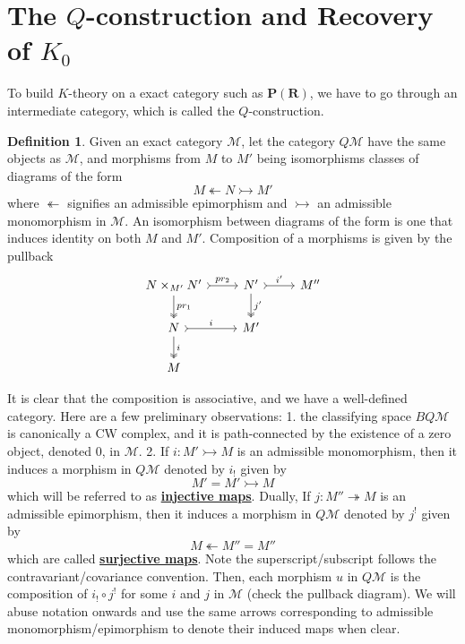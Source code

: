 \documentclass{article}
\theoremstyle{definition}
\theoremstyle{definition}
\newtheorem{definition}{Definition}[theorem]
\theoremstyle{definition}
\theoremstyle{definition}
\theoremstyle{definition}
\theoremstyle{definition}
\theoremstyle{definition}
\begin{document}
\section{The $Q$-construction and Recovery of $K_0$}
To build $K$-theory on a exact category such as $\textbf{P}(\textbf{R})$, we have to go through an intermediate category, which is called the $Q$-construction. 
\begin{tcolorbox}[colback=purple!5!white,colframe=purple!75!black]
\begin{definition}
Given an exact category $\mathcal{M}$, let the category $Q\mathcal{M}$ have the same objects as $\mathcal{M}$, and morphisms from $M$ to $M'$ being isomorphisms classes of diagrams of the form 
\[M\twoheadleftarrow N\rightarrowtail M' \]
where $\twoheadleftarrow$ signifies an admissible epimorphism and $\rightarrowtail$ an admissible monomorphism in $\mathcal{M}$. An isomorphism between diagrams of the form is one that induces identity on both $M$ and $M'$. Composition of a morphisms is given by the pullback 
\[
\begin{tikzcd}
N\times_{M'}N'\arrow[r,rightarrowtail,"pr_2"]\arrow[d,twoheadrightarrow,"pr_1"]&N'\arrow[d,twoheadrightarrow,"j'"]\arrow[r,rightarrowtail,"i'"]&M''\\
N\arrow[d,twoheadrightarrow,"i"]\arrow[r,rightarrowtail,"i"]&M'\\
M
\end{tikzcd}
\]
\end{definition}
\end{tcolorbox}
It is clear that the composition is associative, and we have a well-defined category. Here are a few preliminary observations: 1. the classifying space $BQ\mathcal{M}$ is canonically a CW complex, and it is path-connected by the existence of a zero object, denoted $0$, in $\mathcal{M}$. 2. If $i:M'\rightarrowtail M$ is an admissible monomorphism, then it induces a morphism in $Q\mathcal{M}$ denoted by $i_!$ given by 
\[M'=M'\rightarrowtail M\] 
which will be referred to as \underline{\textbf{injective maps}}. Dually, If $j:M''\twoheadrightarrow M$ is an admissible epimorphism, then it induces a morphism in $Q\mathcal{M}$ denoted by $j^!$ given by 
\[M\twoheadleftarrow M''=M''\] 
which are called \underline{\textbf{surjective maps}}. Note the superscript/subscript follows the contravariant/covariance convention. Then, each morphism $u$ in $Q\mathcal{M}$ is the composition of $i_!\circ j^!$ for some $i$ and $j$ in $\mathcal{M}$ (check the pullback diagram). We will abuse notation onwards and use the same arrows corresponding to admissible monomorphism/epimorphism to denote their induced maps when clear.
\end{document}
